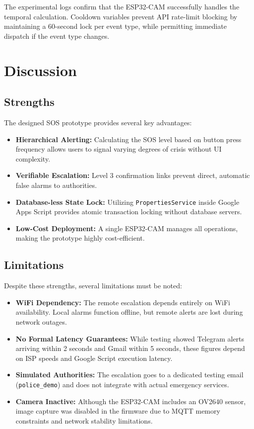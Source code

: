 \documentclass[conference]{IEEEtran}
\begin{document}
The experimental logs confirm that the ESP32-CAM successfully handles the temporal calculation. Cooldown variables prevent API rate-limit blocking by maintaining a 60-second lock per event type, while permitting immediate dispatch if the event type changes.

\section{Discussion}
\subsection{Strengths}
The designed SOS prototype provides several key advantages:
\begin{itemize}
    \item \textbf{Hierarchical Alerting:} Calculating the SOS level based on button press frequency allows users to signal varying degrees of crisis without UI complexity.
    \item \textbf{Verifiable Escalation:} Level 3 confirmation links prevent direct, automatic false alarms to authorities.
    \item \textbf{Database-less State Lock:} Utilizing \texttt{PropertiesService} inside Google Apps Script provides atomic transaction locking without database servers.
    \item \textbf{Low-Cost Deployment:} A single ESP32-CAM manages all operations, making the prototype highly cost-efficient.
\end{itemize}

\subsection{Limitations}
Despite these strengths, several limitations must be noted:
\begin{itemize}
    \item \textbf{WiFi Dependency:} The remote escalation depends entirely on WiFi availability. Local alarms function offline, but remote alerts are lost during network outages.
    \item \textbf{No Formal Latency Guarantees:} While testing showed Telegram alerts arriving within 2 seconds and Gmail within 5 seconds, these figures depend on ISP speeds and Google Script execution latency.
    \item \textbf{Simulated Authorities:} The escalation goes to a dedicated testing email (\texttt{police\_demo}) and does not integrate with actual emergency services.
    \item \textbf{Camera Inactive:} Although the ESP32-CAM includes an OV2640 sensor, image capture was disabled in the firmware due to MQTT memory constraints and network stability limitations.
\end{itemize}
\end{document}

